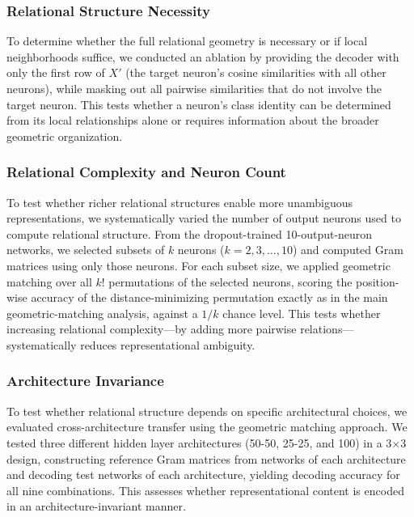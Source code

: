 \subsubsection{Relational Structure Necessity}

To determine whether the full relational geometry is necessary or if local neighborhoods suffice, we conducted an ablation by providing the decoder with only the first row of $X'$ (the target neuron's cosine similarities with all other neurons), while masking out all pairwise similarities that do not involve the target neuron. This tests whether a neuron's class identity can be determined from its local relationships alone or requires information about the broader geometric organization.

\subsubsection{Relational Complexity and Neuron Count}

To test whether richer relational structures enable more unambiguous representations, we systematically varied the number of output neurons used to compute relational structure. From the dropout-trained 10-output-neuron networks, we selected subsets of $k$ neurons ($k = 2, 3, \ldots, 10$) and computed Gram matrices using only those neurons. For each subset size, we applied geometric matching over all $k!$ permutations of the selected neurons, scoring the position-wise accuracy of the distance-minimizing permutation exactly as in the main geometric-matching analysis, against a $1/k$ chance level. This tests whether increasing relational complexity---by adding more pairwise relations---systematically reduces representational ambiguity.

\subsubsection{Architecture Invariance}

To test whether relational structure depends on specific architectural choices, we evaluated cross-architecture transfer using the geometric matching approach. We tested three different hidden layer architectures (50-50, 25-25, and 100) in a 3$\times$3 design, constructing reference Gram matrices from networks of each architecture and decoding test networks of each architecture, yielding decoding accuracy for all nine combinations. This assesses whether representational content is encoded in an architecture-invariant manner.

